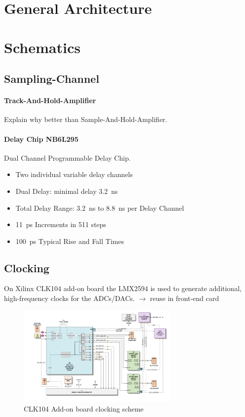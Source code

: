 \section{General Architecture}




\section{Schematics}
\subsection{Sampling-Channel}
\paragraph{Track-And-Hold-Amplifier}
Explain why better than Sample-And-Hold-Amplifier.
\paragraph{Delay Chip NB6L295}
Dual Channel Programmable Delay Chip.

\begin{itemize}[noitemsep]
	\item Two individual variable delay channels
	\item Dual Delay: minimal delay \SI{3.2}{\nano \second}
	\item Total Delay Range: \SI{3.2}{\nano \second} to \SI{8.8}{\nano \second} per Delay Channel
	\item \SI{11}{\pico \second} Increments in 511 steps
	\item \SI{100}{\pico \second} Typical Rise and Fall Times
\end{itemize}

\subsection{Clocking}
On Xilinx CLK104 add-on board the LMX2594 is used to generate additional, high-frequency clocks for the ADCs/DACs. $\rightarrow$ reuse in front-end card
\begin{figure}[tbh]
	\centering
	\includegraphics[width = 0.7\textwidth]{chap/04-work/img/clk104}
	\caption{CLK104 Add-on board clocking scheme}
	\label{fig:clk104}
\end{figure}

